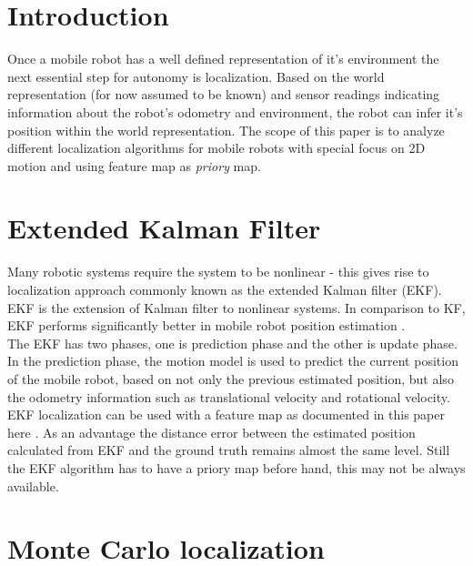 \documentclass[12pt, a4paper, onecolumn]{article}
\begin{document}
\maketitle

\section{Introduction}

Once a mobile robot has a well defined representation of it's environment the next essential step for autonomy is localization. Based on the world representation (for now assumed to be known) and sensor readings indicating information about the robot's odometry and environment, the robot can infer it's position within the world representation. The scope of this paper is to analyze different localization algorithms for mobile robots with special focus on 2D motion and using feature map as \emph{priory} map.

\section{Extended Kalman Filter}

Many robotic systems require the system to be nonlinear - this gives rise to localization approach commonly known as the extended Kalman filter (EKF). EKF is the extension of Kalman filter to nonlinear systems. In comparison to KF, EKF performs significantly better in mobile robot position estimation \cite{Suliman2010}. \\

The EKF has two phases, one is prediction phase and the other is update phase. In the prediction phase, the motion model is used to predict the current position of the mobile robot, based on not only the previous estimated position, but also the odometry information such as translational velocity and rotational velocity. \cite{featureEKF} \\

EKF localization can be used with a feature map as documented in this paper here \cite{featureEKF}. As an advantage the distance error between the estimated position calculated from EKF and the ground truth remains almost the same level. Still the EKF algorithm has to have a priory map before hand, this may not be always available. \cite{featureEKF}

\section{Monte Carlo localization}
\end{document}
